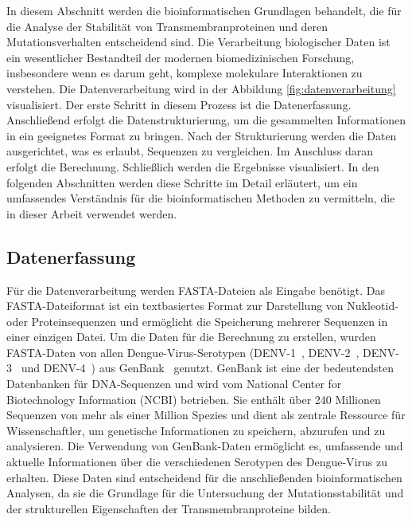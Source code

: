 \documentclass[german,version-2022-01]{uzl-thesis}
\begin{document}
In diesem Abschnitt werden die bioinformatischen Grundlagen behandelt, die f\"ur die Analyse der Stabilit\"at von Transmembranproteinen und deren Mutationsverhalten entscheidend sind. Die Verarbeitung biologischer Daten ist ein wesentlicher Bestandteil der modernen biomedizinischen Forschung, insbesondere wenn es darum geht, komplexe molekulare Interaktionen zu verstehen. Die Datenverarbeitung wird in der Abbildung \ref{fig:datenverarbeitung} visualisiert. Der erste Schritt in diesem Prozess ist die Datenerfassung. Anschlie\ss{}end erfolgt die Datenstrukturierung, um die gesammelten Informationen in ein geeignetes Format zu bringen. Nach der Strukturierung werden die Daten ausgerichtet, was es erlaubt, Sequenzen zu vergleichen. Im Anschluss daran erfolgt die Berechnung. Schlie\ss{}lich werden die Ergebnisse visualisiert. In den folgenden Abschnitten werden diese Schritte im Detail erl\"autert, um ein umfassendes Verst\"andnis f\"ur die bioinformatischen Methoden zu vermitteln, die in dieser Arbeit verwendet werden.

\subsection{Datenerfassung}
F\"ur die Datenverarbeitung werden FASTA-Dateien als Eingabe ben\"otigt. Das FASTA-Dateiformat ist ein textbasiertes Format zur Darstellung von Nukleotid- oder Proteinsequenzen und erm\"oglicht die Speicherung mehrerer Sequenzen in einer einzigen Datei. Um die Daten f\"ur die Berechnung zu erstellen, wurden FASTA-Daten von allen Dengue-Virus-Serotypen (DENV-1~\cite{tittarelli_dengue_2014}, DENV-2~\cite{cao_retrospective_2023}, DENV-3~\cite{peyrefitte_genetic_2003} und DENV-4~\cite{wardhani_genetic_2023}) aus GenBank~\cite{genbank} genutzt. GenBank ist eine der bedeutendsten Datenbanken f\"ur DNA-Sequenzen und wird vom National Center for Biotechnology Information (NCBI) betrieben. Sie enth\"alt \"uber 240 Millionen Sequenzen von mehr als einer Million Spezies und dient als zentrale Ressource f\"ur Wissenschaftler, um genetische Informationen zu speichern, abzurufen und zu analysieren. Die Verwendung von GenBank-Daten erm\"oglicht es, umfassende und aktuelle Informationen \"uber die verschiedenen Serotypen des Dengue-Virus zu erhalten. Diese Daten sind entscheidend f\"ur die anschlie\ss{}enden bioinformatischen Analysen, da sie die Grundlage f\"ur die Untersuchung der Mutationsstabilit\"at und der strukturellen Eigenschaften der Transmembranproteine bilden.
\end{document}
